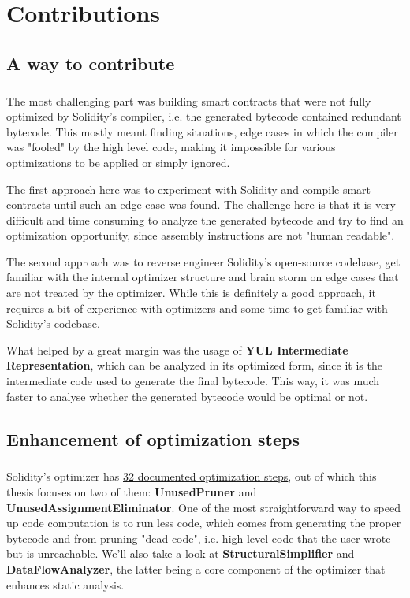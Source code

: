 \chapter{Contributions} 

\section{A way to contribute}
\paragraph*{}
The most challenging part was building smart contracts that were not fully optimized by Solidity's compiler, i.e. the generated bytecode contained redundant bytecode. This mostly meant finding situations, edge cases in which the compiler was "fooled" by the high level code, making it impossible for various optimizations to be applied or simply ignored.

The first approach here was to experiment with Solidity and compile smart contracts until such an edge case was found. The challenge here is that it is very difficult and time consuming to analyze the generated bytecode and try to find an optimization opportunity, since assembly instructions are not "human readable".

The second approach was to reverse engineer Solidity's open-source codebase, get familiar with the internal optimizer structure and brain storm on edge cases that are not treated by the optimizer. While this is definitely a good approach, it requires a bit of experience with optimizers and some time to get familiar with Solidity's codebase.

What helped by a great margin was the usage of \textbf{YUL Intermediate Representation}, which can be analyzed in its optimized form, since it is the intermediate code used to generate the final bytecode. This way, it was much faster to analyse whether the generated bytecode would be optimal or not.

\section{Enhancement of optimization steps}
\paragraph*{}
Solidity's optimizer has \href{https://docs.soliditylang.org/en/v0.8.14/internals/optimizer.html#optimizer-steps}{32 documented optimization steps}, out of which this thesis focuses on two of them: \textbf{UnusedPruner} and \textbf{UnusedAssignmentEliminator}. One of the most straightforward way to speed up code computation is to run less code, which comes from generating the proper bytecode and from pruning "dead code", i.e. high level code that the user wrote but is unreachable. We'll also take a look at \textbf{StructuralSimplifier} and \textbf{DataFlowAnalyzer}, the latter being a core component of the optimizer that enhances static analysis.

